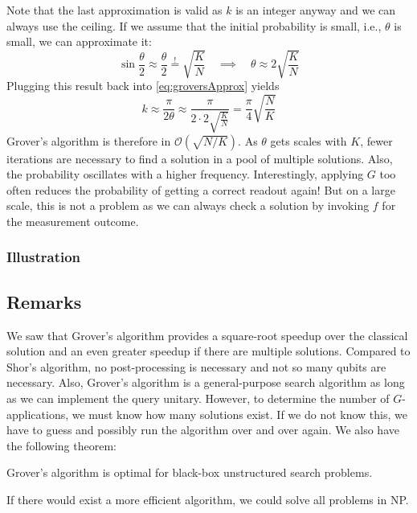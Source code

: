 				Note that the last approximation is valid as \(k\) is an integer anyway and we can always use the ceiling. If we assume that the initial probability is small, i.e., \(\theta\) is small, we can approximate it:
				\begin{equation}
					\sin\frac{\theta}{2} \approx \frac{\theta}{2} \overset{!}{=} \sqrt{\frac{K}{N}}
					\quad\implies\quad
					\theta \approx 2 \sqrt{\frac{K}{N}}
				\end{equation}
				Plugging this result back into \eqref{eq:groversApprox} yields
				\begin{equation}
					k
						\approx \frac{\pi}{2 \theta}
						\approx \frac{\pi}{2 \cdot 2 \sqrt{\frac{K}{N}}}
						= \frac{\pi}{4} \sqrt{\frac{N}{K}}
				\end{equation}
				Grover's algorithm is therefore in \( \mathcal{O}(\sqrt{N / K}) \). As \(\theta\) gets scales with \(K\), fewer iterations are necessary to find a solution in a pool of multiple solutions. Also, the probability oscillates with a higher frequency. Interestingly, applying \(G\) too often reduces the probability of getting a correct readout again! But on a large scale, this is not a problem as we can always check a solution by invoking \(f\) for the measurement outcome.

			\subsubsection{Illustration}

		\subsection{Remarks}
			We saw that Grover's algorithm provides a square-root speedup over the classical solution and an even greater speedup if there are multiple solutions. Compared to Shor's algorithm, no post-processing is necessary and not so many qubits are necessary. Also, Grover's algorithm is a general-purpose search algorithm as long as we can implement the query unitary. However, to determine the number of \(G\)-applications, we must know how many solutions exist. If we do not know this, we have to guess and possibly run the algorithm over and over again. We also have the following theorem:
			\begin{theorem}
				Grover's algorithm is optimal for black-box unstructured search problems.
			\end{theorem}
			If there would exist a more efficient algorithm, we could solve all problems in NP.

